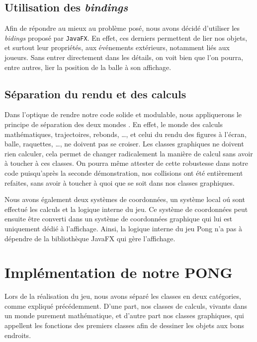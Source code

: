 \documentclass[a4paper,10pt]{article}
\theoremstyle{definition}
\begin{document}
    \subsection{Utilisation des \emph{bindings}}
    Afin de répondre au mieux au problème posé, nous avons décidé d'utiliser les \emph{bidings} proposé par \lstinline{JavaFX}. En effet, ces derniers permettent de lier nos objets, et surtout leur propriétés, aux événements extérieurs, notamment liés aux joueurs. Sans entrer directement dans les détails, on voit bien que l'on pourra, entre autres, lier la position de la balle à son affichage.
    
    \subsection{Séparation du rendu et des calculs}
    Dans l'optique de rendre notre code solide et modulable, nous appliquerons le principe de \og séparation des deux mondes \fg{}. En effet, le monde des calculs mathématiques, trajectoires, rebonds, \dots, et celui du rendu des figures à l'écran, balle, raquettes, \dots, ne doivent pas se croiser. Les classes graphiques ne doivent rien calculer, cela permet de changer radicalement la manière de calcul sans avoir à toucher à ces classes. On pourra même attester de cette robustesse dans notre code puisqu'après la seconde démonstration, nos collisions ont été entièrement refaites, sans avoir à toucher à quoi que se soit dans nos classes graphiques.

    Nous avons également deux systèmes de coordonnées, un système local o\'u sont effectué les calculs et la logique interne du jeu. Ce système de coordonnées peut ensuite être converti dans un système de coordonnées graphique qui lui est uniquement dédié à l'affichage. Ainsi, la logique interne du jeu Pong n'a pas à dépendre de la bibliothèque JavaFX qui gère l'affichage.
    
\section{Implémentation de notre PONG}
%

Lors de la réalisation du jeu, nous avons séparé les classes en deux catégories, comme expliqué précédemment. D'une part, nos classes de calculs, vivants dans un monde purement mathématique, et d'autre part nos classes graphiques, qui appellent les fonctions des premiers classes afin de dessiner les objets aux bons endroits.
\end{document}
